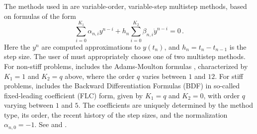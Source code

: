 The methods used in {\cvodes} are variable-order, variable-step multistep
methods, based on formulas of the form
\begin{equation}\label{e:lmm}
 \sum_{i = 0}^{K_1} \alpha_{n,i} y^{n-i} + 
     h_n \sum_{i = 0}^{K_2} \beta_{n,i} {{\dot y}}^{n-i} = 0 \, .
\end{equation}
Here the $y^n$ are computed approximations to $y(t_n)$, and
$h_n = t_n - t_{n-1}$ is the step size.  The user of {\cvodes} must
appropriately choose one of two multistep methods.  For non-stiff problems,
{\cvodes} includes the Adams-Moulton formulas ,
characterized by $K_1 = 1$
and $K_2 = q$ above, where the order $q$ varies between $1$ and $12$.
For stiff problems, {\cvodes} includes the Backward Differentiation
Formulas (BDF)   
in so-called fixed-leading coefficient (FLC) form, given by
$K_1 = q$ and $K_2 = 0$, with order $q$ varying between $1$ and $5$.
The coefficients are uniquely determined by the method type, its
order, the recent history of the step sizes, and the normalization
$\alpha_{n,0} = -1$.  See \cite{ByHi:75} and \cite{JaSD:80}.

